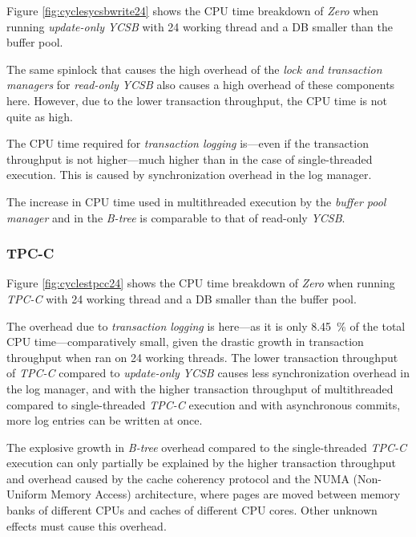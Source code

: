     Figure \ref{fig:cyclesycsbwrite24} shows the CPU time breakdown of \textit{Zero} when running \emph{update-only} \textit{YCSB} with 24 working thread and a DB smaller than the buffer pool.

    The same spinlock that causes the high overhead of the \emph{lock and transaction managers} for \emph{read-only} \textit{YCSB} also causes a high overhead of these components here. However, due to the lower transaction throughput, the CPU time is not quite as high.

    The CPU time required for \emph{transaction logging} is---even if the transaction throughput is not higher---much higher than in the case of single-threaded execution. This is caused by synchronization overhead in the log manager.

    The increase in CPU time used in multithreaded execution by the \emph{buffer pool manager} and in the \emph{B-tree} is comparable to that of read-only \textit{YCSB}.

\subsubsection{TPC-C} \label{subsubsec:looking_glass_multi_threaded_tpcc}

    Figure \ref{fig:cyclestpcc24} shows the CPU time breakdown of \textit{Zero} when running \textit{TPC-C} with 24 working thread and a DB smaller than the buffer pool.

    The overhead due to \emph{transaction logging} is here---as it is only \SI{8.45}{\percent} of the total CPU time---comparatively small, given the drastic growth in transaction throughput when ran on 24 working threads. The lower transaction throughput of \textit{TPC-C} compared to \emph{update-only} \textit{YCSB} causes less synchronization overhead in the log manager, and with the higher transaction throughput of multithreaded compared to single-threaded \textit{TPC-C} execution and with asynchronous commits, more log entries can be written at once.

    The explosive growth in \emph{B-tree} overhead compared to the single-threaded \textit{TPC-C} execution can only partially be explained by the higher transaction throughput and overhead caused by the cache coherency protocol and the NUMA (Non-Uniform Memory Access) architecture, where pages are moved between memory banks of different CPUs and caches of different CPU cores. Other unknown effects must cause this overhead.

